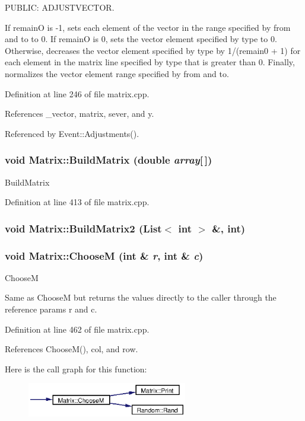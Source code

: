 PUBLIC: ADJUSTVECTOR.

If remain\-O is -1, sets each element of the vector in the range specified by from and to to 0. If remain\-O is 0, sets the vector element specified by type to 0. Otherwise, decreases the vector element specified by type by 1/(remain0 + 1) for each element in the matrix line specified by type that is greater than 0. Finally, normalizes the vector element range specified by from and to. 

Definition at line 246 of file matrix.cpp.

References \_\-vector, matrix, sever, and y.

Referenced by Event::Adjustments().
\subsubsection{\setlength{\rightskip}{0pt plus 5cm}void Matrix::Build\-Matrix (double {\em array}[$\,$])}\label{classMatrix_a11}


Build\-Matrix 

Definition at line 413 of file matrix.cpp.
\subsubsection{\setlength{\rightskip}{0pt plus 5cm}void Matrix::Build\-Matrix2 ({\bf List}$<$ int $>$ \&, int)}\label{classMatrix_a12}


\subsubsection{\setlength{\rightskip}{0pt plus 5cm}void Matrix::Choose\-M (int \& {\em r}, int \& {\em c})}\label{classMatrix_a15}


Choose\-M

Same as Choose\-M but returns the values directly to the caller through the reference params r and c. 

Definition at line 462 of file matrix.cpp.

References Choose\-M(), col, and row.

Here is the call graph for this function:\begin{figure}[H]
\begin{center}
\leavevmode
\includegraphics[width=198pt]{classMatrix_a15_cgraph}
\end{center}
\end{figure}
